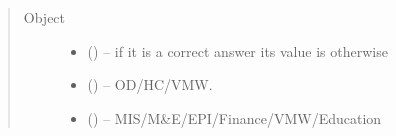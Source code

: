 \documentclass[letterpaper,10pt,english,openany,oneside]{sphinxmanual}
\begin{document}
\begin{fulllineitems}
\begin{sphinxVerbatim}[commandchars=\\\{\}]
                   
                   
                   
          \PYG{p}{]}
  \PYG{p}{]}
\end{sphinxVerbatim}
\begin{quote}\begin{description}
\item[{Object}] \leavevmode\begin{itemize}
\item {} 
\sphinxAtStartPar
{} () – if it is a correct answer its value is  otherwise 

\item {} 
\sphinxAtStartPar
{} () – OD/HC/VMW.

\item {} 
\sphinxAtStartPar
{} () – MIS/M\&E/EPI/Finance/VMW/Education

\end{itemize}

\end{description}\end{quote}

\end{fulllineitems}
\end{document}

